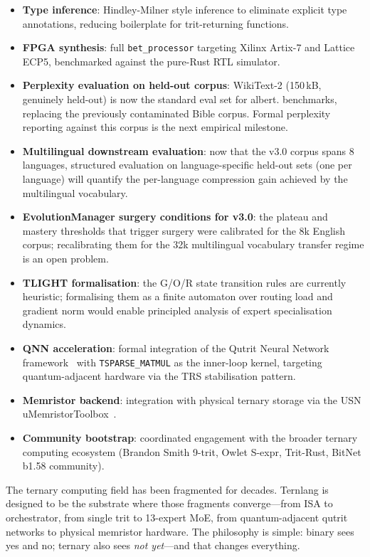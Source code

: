 \documentclass[11pt,a4paper]{article}
\begin{document}
\begin{itemize}
  \item \textbf{Type inference}: Hindley-Milner style inference to eliminate
        explicit type annotations, reducing boilerplate for trit-returning
        functions.
  \item \textbf{FPGA synthesis}: full \texttt{bet\_processor} targeting
        Xilinx Artix-7 and Lattice ECP5, benchmarked against the pure-Rust RTL
        simulator.
  \item \textbf{Perplexity evaluation on held-out corpus}: WikiText-2
        (150\,kB, genuinely held-out) is now the standard eval set for albert.
        benchmarks, replacing the previously contaminated Bible corpus. Formal
        perplexity reporting against this corpus is the next empirical milestone.
  \item \textbf{Multilingual downstream evaluation}: now that the v3.0 corpus
        spans 8 languages, structured evaluation on language-specific held-out
        sets (one per language) will quantify the per-language compression gain
        achieved by the multilingual vocabulary.
  \item \textbf{EvolutionManager surgery conditions for v3.0}: the plateau and
        mastery thresholds that trigger surgery were calibrated for the 8k English
        corpus; recalibrating them for the 32k multilingual vocabulary transfer
        regime is an open problem.
  \item \textbf{TLIGHT formalisation}: the G/O/R state transition rules are
        currently heuristic; formalising them as a finite automaton over routing
        load and gradient norm would enable principled analysis of expert
        specialisation dynamics.
  \item \textbf{QNN acceleration}: formal integration of the Qutrit Neural
        Network framework~\cite{kepp2026qnn} with \texttt{TSPARSE\_MATMUL} as
        the inner-loop kernel, targeting quantum-adjacent hardware via the
        TRS stabilisation pattern.
  \item \textbf{Memristor backend}: integration with physical ternary storage
        via the USN uMemristorToolbox~\cite{bos2020ternary}.
  \item \textbf{Community bootstrap}: coordinated engagement with the broader
        ternary computing ecosystem (Brandon Smith 9-trit, Owlet S-expr,
        Trit-Rust, BitNet b1.58 community).
\end{itemize}

The ternary computing field has been fragmented for decades. Ternlang is
designed to be the substrate where those fragments converge—from ISA to
orchestrator, from single trit to 13-expert MoE, from quantum-adjacent
qutrit networks to physical memristor hardware. The philosophy is simple:
binary sees yes and no; ternary also sees \emph{not yet}—and that changes
everything.



\end{document}
